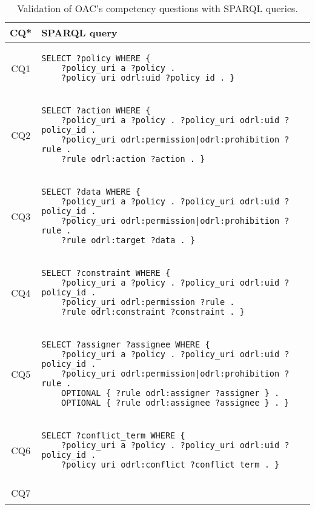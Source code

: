 \begin{table}[htp]
    \centering
    \caption{Validation of OAC's competency questions with SPARQL queries.}
    \label{tab:oac_cq_sparql}
    \begin{tabular}{c|l}
        \textbf{CQ*} & \textbf{SPARQL query} \\
        \hline\hline
        CQ1 & \begin{lstlisting}[numbers=none]
SELECT ?policy WHERE {
    ?policy_uri a ?policy . 
    ?policy_uri odrl:uid ?policy_id . } \end{lstlisting} \\
        \hline
        CQ2 & \begin{lstlisting}[numbers=none]
SELECT ?action WHERE {
    ?policy_uri a ?policy . ?policy_uri odrl:uid ?policy_id . 
    ?policy_uri odrl:permission|odrl:prohibition ?rule .
    ?rule odrl:action ?action . } \end{lstlisting} \\
        \hline
        CQ3 & \begin{lstlisting}[numbers=none]
SELECT ?data WHERE {
    ?policy_uri a ?policy . ?policy_uri odrl:uid ?policy_id . 
    ?policy_uri odrl:permission|odrl:prohibition ?rule .
    ?rule odrl:target ?data . } \end{lstlisting} \\
        \hline
        CQ4 & \begin{lstlisting}[numbers=none]
SELECT ?constraint WHERE {
    ?policy_uri a ?policy . ?policy_uri odrl:uid ?policy_id . 
    ?policy_uri odrl:permission ?rule .
    ?rule odrl:constraint ?constraint . } \end{lstlisting} \\
        \hline
        CQ5 & \begin{lstlisting}[numbers=none]
SELECT ?assigner ?assignee WHERE {
    ?policy_uri a ?policy . ?policy_uri odrl:uid ?policy_id . 
    ?policy_uri odrl:permission|odrl:prohibition ?rule .
    OPTIONAL { ?rule odrl:assigner ?assigner } . 
    OPTIONAL { ?rule odrl:assignee ?assignee } . } \end{lstlisting} \\
        \hline
        CQ6 & \begin{lstlisting}[numbers=none]
SELECT ?conflict_term WHERE {
    ?policy_uri a ?policy . ?policy_uri odrl:uid ?policy_id . 
    ?policy_uri odrl:conflict ?conflict_term . } \end{lstlisting} \\
        \hline
        CQ7 & \begin{lstlisting}[numbers=none]

\end{lstlisting}
\end{tabular}
\end{table}
